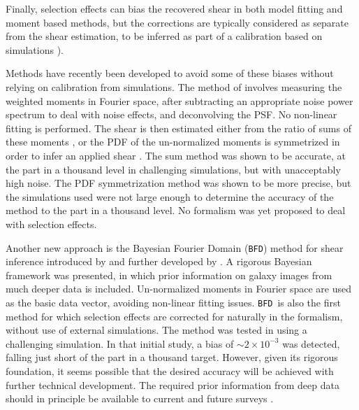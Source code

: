 \documentclass[iop]{emulateapj}
\newcommand{\bfd}{\texttt{BFD}}
\begin{document}
Finally, selection effects can bias the recovered shear in both model fitting
and moment based methods, but the corrections are typically considered as
separate from the shear estimation, to be inferred as part of a calibration
based on simulations \citep{Jarvis2016,KidsShear2016}).

Methods have recently been developed to avoid some of these biases without
relying on calibration from simulations.  The method of \citep{Zhang2017}
involves measuring the weighted moments in Fourier space, after subtracting an
appropriate noise power spectrum to deal with noise effects, and deconvolving
the PSF.  No non-linear fitting is performed.  The shear is then estimated
either from the ratio of sums of these moments \citep{Zhang2015}, or the PDF of
the un-normalized moments is symmetrized in order to infer an applied shear
\citep{Zhang2017}.  The sum method was shown to be accurate, at the part in a
thousand level in challenging simulations, but with unacceptably high noise.
The PDF symmetrization method was shown to be more precise, but the simulations
used were not large enough to determine the accuracy of the method to the part
in a thousand level.  No formalism was yet proposed to deal with selection
effects. 

Another new approach is the Bayesian Fourier Domain (\bfd) method for shear
inference introduced by \cite{ba14} and further developed by \cite{bfd2016}.  A
rigorous Bayesian framework was presented, in which prior information on galaxy
images from much deeper data is included.  Un-normalized moments in
Fourier space are used as the basic data vector, avoiding non-linear fitting
issues.  \bfd\ is also the first method for which selection effects are
corrected for naturally in the formalism, without use of external
simulations.  The method was tested in \cite{bfd2016} using a challenging
simulation.  In that initial study, a bias of $\sim 2 \times 10^{-3}$ was
detected, falling just short of the part in a thousand target.  However, given
its rigorous foundation, it seems possible that the desired accuracy will be
achieved with further technical development.  The required prior information
from deep data should in principle be available to current and future surveys
\citep{DESWhitePaper,TakadaHSC2010,IvezicLSST08,Euclid2011,SpergelWFIRST2015}.


\end{document}
